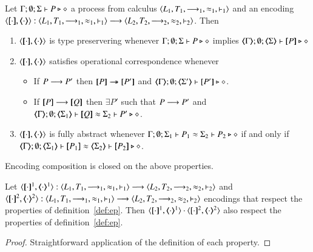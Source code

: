 \begin{definition}
	\label{def:ep}
	Let $\Gamma; \emptyset; \Sigma \vdash P \triangleright \diamond$ 
	a process from calculus $\langle L_1, T_1, \longrightarrow_1, \approx_1, \vdash_1 \rangle$
	and an encoding 
	$\enc{\cdot}{\cdot}: \calc{L_1}{T_1}{\red_1}{\wb_1}{\proves_1} \longrightarrow \calc{L_2}{T_2}{\red_2}{\wb_2}{\proves_2}$.
	Then
	\begin{enumerate}
		\item	$\enc{\cdot}{\cdot}$ is type preservering whenever
			$\Gamma; \emptyset; \Sigma \vdash P \triangleright \diamond$ implies $\mapt{\Gamma}; \emptyset; \mapt{\Sigma} \proves \map{P} \hastype \Proc$

		\item	$\enc{\cdot}{\cdot}$ satisfies operational correspondence whenever
		\begin{itemize}
			\item	If $P \longrightarrow P'$ then
				$\map{P} \Red \map{P'}$ and
				$\mapt{\Gamma}; \emptyset; \mapt{\Sigma'} \proves \map{P'} \hastype \Proc$.
			\item	If $\map{P} \red \map{Q}$ then
				$\exists P'$ such that $P \longrightarrow P'$ and 
				$\mapt{\Gamma};\emptyset; \mapt{\Sigma_1} \proves \map{Q} \wb \Sigma_2 \proves P' \hastype \Proc$.
		\end{itemize}
		
		\item	$\enc{\cdot}{\cdot}$ is fully abstract whenever
			$\Gamma; \emptyset; \Sigma_1 \vdash P_1 \approx \Sigma_2 \vdash P_2 \triangleright \diamond$ if and only if
			$\mapt{\Gamma}; \emptyset; \mapt{\Sigma_1} \proves \map{P_1} \wb \mapt{\Sigma_2} \proves \map{P_2} \hastype \Proc$.
	\end{enumerate}
\end{definition}

Encoding composition is closed on the above properties.

\begin{proposition}
	Let $\encod{\cdot}{\cdot}{1}: \calc{L_1}{T_1}{\red_1}{\wb_1}{\proves_1} \longrightarrow \calc{L_2}{T_2}{\red_2}{\wb_2}{\proves_2}$ and 
	$\encod{\cdot}{\cdot}{2}: \calc{L_1}{T_1}{\red_1}{\wb_1}{\proves_1} \longrightarrow \calc{L_2}{T_2}{\red_2}{\wb_2}{\proves_2}$
	encodings that respect the properties of definition~\ref{def:ep}.
	Then $\encod{\cdot}{\cdot}{1} \cdot \encod{\cdot}{\cdot}{2}$
	also respect the properties of definition~\ref{def:ep}.
\end{proposition}

\begin{proof}
	Straightforward application of the definition of each property.
\end{proof}

